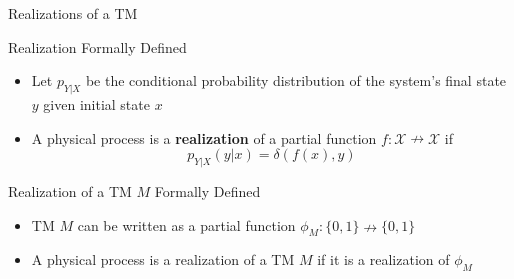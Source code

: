 \begin{frame}{Realizations of a TM}
\begin{block}{Realization Formally Defined}
	\begin{itemize}
		\item Let $p_{Y|X}$ be the conditional probability distribution of the system's final state $y$ given initial state $x$
		\item A physical process is a \textbf{realization} of a partial function $f : \mathcal{X} \nrightarrow \mathcal{X}$ if
		\begin{equation*}
			p_{Y|X}(y|x) = \delta(f(x),y)
		\end{equation*}
	\end{itemize}		
\end{block}
\begin{block}{Realization of a TM $M$ Formally Defined}
	\begin{itemize}
		\item TM $M$ can be written as a partial function $\phi_M:\{0,1\} \nrightarrow\{0,1\}$
		\item A physical process is a realization of a TM $M$ if it is a realization of $\phi_M$
	\end{itemize}
\end{block}
\end{frame}